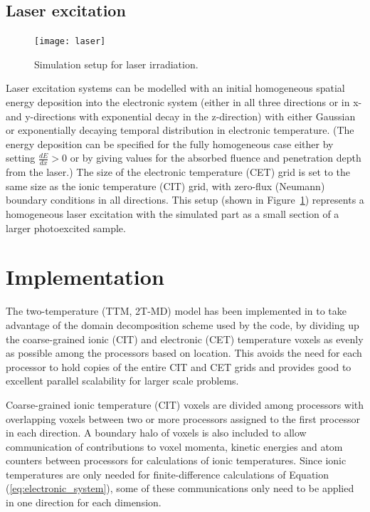 \subsection*{Laser excitation}

\begin{figure}[h] 
	\centering
	{
		\texttt{[image: laser]}
	}
	\caption{Simulation setup for laser irradiation.}
	\label{fig:laser}
\end{figure}
Laser excitation systems can be modelled with an initial homogeneous
spatial energy deposition into the electronic system (either in all three directions
or in x- and y-directions with exponential decay in the z-direction) with either Gaussian 
or exponentially decaying temporal distribution in electronic temperature. 
(The energy deposition can be specified for the fully homogeneous case 
either by setting $\frac{dE}{dx} > 0$ or by giving values for the absorbed fluence 
and penetration depth from the laser.) The size of the electronic temperature (CET) 
grid is set to the same size as the ionic temperature (CIT) grid, with zero-flux 
(Neumann) boundary conditions in all directions. This setup (shown in Figure~\ref{fig:laser}) 
represents a homogeneous laser excitation with the simulated part as a 
small section of a larger photoexcited sample.

\section{Implementation}

The two-temperature (TTM, 2T-MD) model has been implemented in \D
to take advantage of the domain decomposition scheme used by the code,
by dividing up the coarse-grained ionic (CIT) and electronic (CET) 
temperature voxels as evenly as possible among the processors based on 
location. This avoids the need for each processor to hold copies of the 
entire CIT and CET grids and provides good to excellent parallel scalability 
for larger scale problems.

Coarse-grained ionic temperature (CIT) voxels are divided among processors 
with overlapping voxels between two or more processors assigned to the 
first processor in each direction. A boundary halo of voxels is also included 
to allow communication of contributions to voxel momenta, kinetic energies and 
atom counters between processors for calculations of ionic temperatures. Since 
ionic temperatures are only needed for finite-difference calculations of 
Equation (\ref{eq:electronic_system}), some of these communications only 
need to be applied in one direction for each dimension. 

